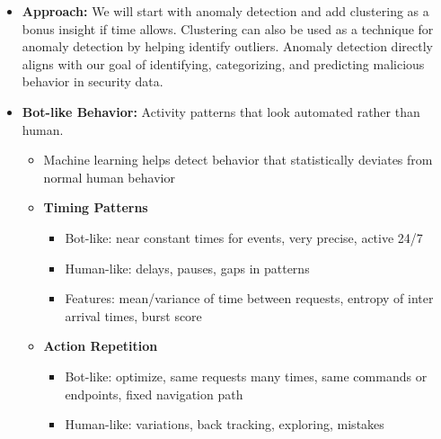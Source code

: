 \documentclass{article}
\begin{document}
\begin{itemize}
\begin{itemize}
\begin{itemize}
\begin{itemize}
                \item Effective for detecting compromised accounts 
                \item Compare current vs historical behavior 
            \end{itemize}
            \item \textbf{Structural Anomaly:} occurs when a relationship between features break down 
            \begin{itemize}
                \item Ex: normal request rate but abnormally high error rate, normal session duration, but unusual command diversity, high authentication success with low credential entropy
            \end{itemize}
        \end{itemize}
    \end{itemize}
    \item \textbf{Approach:} We will start with anomaly detection and add clustering as a bonus insight if time allows. Clustering can also be used as a technique for anomaly detection by helping identify outliers. Anomaly detection directly aligns with our goal of identifying, categorizing, and predicting malicious behavior in security data. 
    \item \textbf{Bot-like Behavior:} Activity patterns that look automated rather than human. 
    \begin{itemize}
        \item Machine learning helps detect behavior that statistically deviates from normal human behavior
        \item \textbf{Timing Patterns}
        \begin{itemize}
            \item Bot-like: near constant times for events, very precise, active 24/7
            \item Human-like: delays, pauses, gaps in patterns 
            \item Features: mean/variance of time between requests, entropy of inter arrival times, burst score
        \end{itemize}
        \item \textbf{Action Repetition}
        \begin{itemize}
            \item Bot-like: optimize, same requests many times, same commands or endpoints, fixed navigation path
            \item Human-like: variations, back tracking, exploring, mistakes

\end{itemize}
\end{itemize}
\end{itemize}
\end{document}
